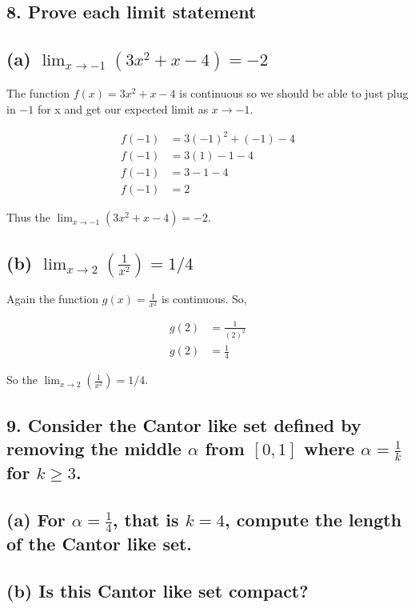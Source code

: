 \documentclass{article}
\begin{document}
\subsection*{8. Prove each limit statement}

\subsection*{(a) $\lim_{x \to -1} \left( 3x^2 + x - 4 \right) = -2$}

The function $f(x) = 3x^2+x-4$ is continuous so we should be able to just plug in $-1$ for x and get our expected limit as $x \rightarrow -1$.

\begin{align*}
    f(-1) &= 3(-1)^2 + (-1) - 4 \\
    f(-1) &= 3(1) - 1 - 4 \\
    f(-1) &= 3 - 1 - 4 \\
    f(-1) &= 2
\end{align*}
    
Thus the $\lim_{x \to -1} \left( 3x^2 + x - 4 \right) = -2$.

\subsection*{(b) $\lim_{x \to 2} \left( \frac{1}{x^2} \right) = 1/4$}

Again the function $g(x) = \frac{1}{x^2}$ is continuous. So,

\begin{align*}
    g(2) &= \frac{1}{(2)^2} \\
    g(2) &= \frac{1}{4}
\end{align*}

So the $\lim_{x \to 2} \left( \frac{1}{x^2} \right) = 1/4$.


\subsection*{9. Consider the Cantor like set defined by removing the middle $\alpha$ from $[0,1]$ where $\alpha = \frac{1}{k}$ for $ k \ge 3$.}

\subsection*{(a) For $\alpha = \frac{1}{4}$, that is $k = 4$, compute the length of the Cantor like set.}

\subsection*{(b) Is this Cantor like set compact?}
\end{document}

